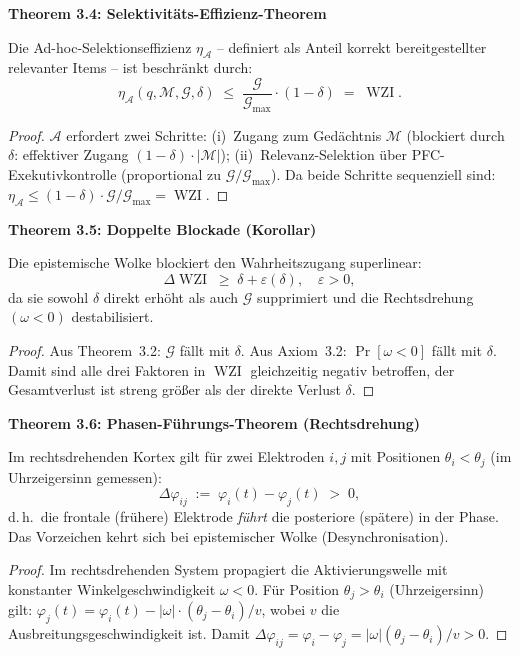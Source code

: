 ﻿\documentclass[12pt,a4paper]{report}
\theoremstyle{plain}
\theoremstyle{definition}
\theoremstyle{remark}
\DeclareMathOperator{\WZI}{WZI}
\begin{document}
	
	\noindent\textbf{Theorem 3.4: Selektivitäts-Effizienz-Theorem}

		\label{thm:selektion}
		Die Ad-hoc-Selektionseffizienz $\eta_{\mathcal{A}}$ -- definiert als
		Anteil korrekt bereitgestellter relevanter Items -- ist beschränkt durch:
		\[
		\eta_{\mathcal{A}}(q, \mathcal{M}, \mathcal{G}, \delta)
		\;\leq\;
		\frac{\mathcal{G}}{\mathcal{G}_{\max}} \cdot (1-\delta)
		\;=\; \WZI.
		\]

	
	\begin{proof}
		$\mathcal{A}$ erfordert zwei Schritte: (i)~Zugang zum Gedächtnis $\mathcal{M}$
		(blockiert durch $\delta$: effektiver Zugang $(1-\delta)\cdot|\mathcal{M}|$);
		(ii)~Relevanz-Selektion über PFC-Exekutivkontrolle (proportional zu $\mathcal{G}/\mathcal{G}_{\max}$).
		Da beide Schritte sequenziell sind:
		$\eta_{\mathcal{A}} \leq (1-\delta) \cdot \mathcal{G}/\mathcal{G}_{\max} = \WZI$. 
	\end{proof}
	
	
	\noindent\textbf{Theorem 3.5: Doppelte Blockade (Korollar)}

		Die epistemische Wolke blockiert den Wahrheitszugang superlinear:
		\[
		\Delta\WZI \;\geq\; \delta + \varepsilon(\delta), \quad \varepsilon > 0,
		\]
		da sie sowohl $\delta$ direkt erhöht als auch $\mathcal{G}$ supprimiert
		und die Rechtsdrehung $(\omega < 0)$ destabilisiert.

	
	\begin{proof}
		Aus Theorem~3.2: $\mathcal{G}$ fällt mit $\delta$.
		Aus Axiom~3.2: $\Pr[\omega < 0]$ fällt mit $\delta$.
		Damit sind alle drei Faktoren in $\WZI$ gleichzeitig negativ betroffen,
		der Gesamtverlust ist streng grö\ss{}er als der direkte Verlust $\delta$. 
	\end{proof}
	
	
	\noindent\textbf{Theorem 3.6: Phasen-Führungs-Theorem (Rechtsdrehung)}

		\label{thm:phasenfuehr}
		Im rechtsdrehenden Kortex gilt für zwei Elektroden $i, j$
		mit Positionen $\theta_i < \theta_j$ (im Uhrzeigersinn gemessen):
		\[
		\Delta\varphi_{ij} \;:=\; \varphi_i(t) - \varphi_j(t) \;>\; 0,
		\]
		d.\,h.\ die frontale (frühere) Elektrode \emph{führt} die
		posteriore (spätere) in der Phase. Das Vorzeichen kehrt sich bei
		epistemischer Wolke (Desynchronisation).

	
	\begin{proof}
		Im rechtsdrehenden System propagiert die Aktivierungswelle mit konstanter
		Winkelgeschwindigkeit $\omega < 0$.
		Für Position $\theta_j > \theta_i$ (Uhrzeigersinn) gilt:
		$\varphi_j(t) = \varphi_i(t) - |\omega|\cdot(\theta_j - \theta_i)/v$,
		wobei $v$ die Ausbreitungsgeschwindigkeit ist.
		Damit $\Delta\varphi_{ij} = \varphi_i - \varphi_j = |\omega|(\theta_j-\theta_i)/v > 0$. 
	\end{proof}
	
\end{document}
